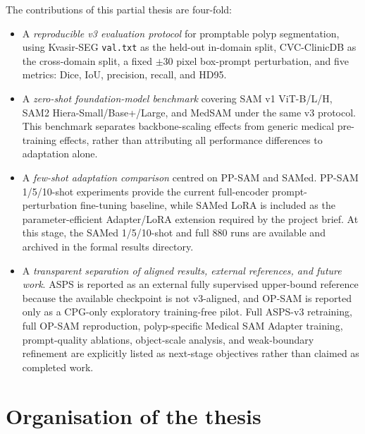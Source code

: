The contributions of this partial thesis are four-fold:
\begin{itemize}
    \item A \emph{reproducible v3 evaluation protocol} for promptable polyp segmentation, using Kvasir-SEG \texttt{val.txt} as the held-out in-domain split, CVC-ClinicDB as the cross-domain split, a fixed $\pm30$ pixel box-prompt perturbation, and five metrics: Dice, IoU, precision, recall, and HD95.

    \item A \emph{zero-shot foundation-model benchmark} covering SAM v1 ViT-B/L/H, SAM2 Hiera-Small/Base+/Large, and MedSAM under the same v3 protocol. This benchmark separates backbone-scaling effects from generic medical pre-training effects, rather than attributing all performance differences to adaptation alone.

    \item A \emph{few-shot adaptation comparison} centred on PP-SAM and SAMed. PP-SAM 1/5/10-shot experiments provide the current full-encoder prompt-perturbation fine-tuning baseline, while SAMed LoRA is included as the parameter-efficient Adapter/LoRA extension required by the project brief. At this stage, the SAMed 1/5/10-shot and full 880 runs are available and archived in the formal results directory.

    \item A \emph{transparent separation of aligned results, external references, and future work}. ASPS is reported as an external fully supervised upper-bound reference because the available checkpoint is not v3-aligned, and OP-SAM is reported only as a CPG-only exploratory training-free pilot. Full ASPS-v3 retraining, full OP-SAM reproduction, polyp-specific Medical SAM Adapter training, prompt-quality ablations, object-scale analysis, and weak-boundary refinement are explicitly listed as next-stage objectives rather than claimed as completed work.
\end{itemize}

\section{Organisation of the thesis}
\label{sec:organisation}

